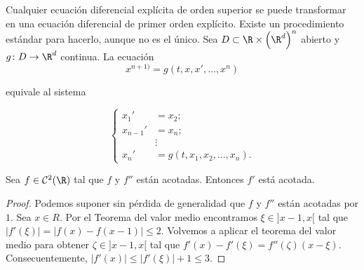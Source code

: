 \documentclass{article}
\begin{document}
Cualquier ecuación diferencial explícita de orden superior se puede transformar en una ecuación
diferencial de primer orden explícito. Existe un procedimiento estándar para hacerlo, aunque no es
el único. Sea $D \subset \R \times \left(\R^d\right)^n$ abierto y $g \colon D \to \R^d$ continua. La
ecuación
\begin{equation}
  \label{eq:ed:sup}
  x^{n+1)} = g(t, x, x', \ldots, x^n)
\end{equation}

equivale al sistema

\begin{equation}
  \label{eq:ed:sup:sis}
  \begin{cases}
    x_1' & = x_2; \\
    x_{n-1}' & = x_n; \\
    & \vdots \\
    x_n' & = g(t, x_1, x_2, \ldots, x_n).
  \end{cases}
\end{equation}

\begin{lem} \label{lem:2-cota} Sea $f \in \mathcal{C}^2(\R)$ tal que $f$ y $f''$ están
  acotadas. Entonces $f'$ está acotada.
\end{lem}
\begin{proof}
  Podemos suponer sin pérdida de generalidad que $f$ y $f''$ están acotadas por $1$. Sea $x \in
  R$. Por el Teorema del valor medio encontramos $\xi \in ]x-1,x[$ tal que
  $|f'(\xi)| = |f(x) - f(x-1)| \le 2$. Volvemos a aplicar el teorema del valor medio para obtener
  $\zeta \in ]x-1,x[$ tal que $f'(x)-f'(\xi) = f''(\zeta)(x-\xi)$. Consecuentemente,
  $|f'(x)| \le |f'(\xi)| + 1 \le 3$.
\end{proof}
\end{document}
